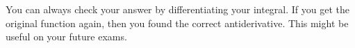 \documentclass{book}
\newcommand{\dx}{\,dx}
\newcommand{\du}{\,du}
\newcommand{\dt}{\,dt}
\newcommand{\dint}{\displaystyle \int}
\begin{document}
You can always check your answer by differentiating your integral. If you get the original function again, then you found the correct antiderivative. This might be useful on your future exams. 


%
%
%


%
%
\end{document}
